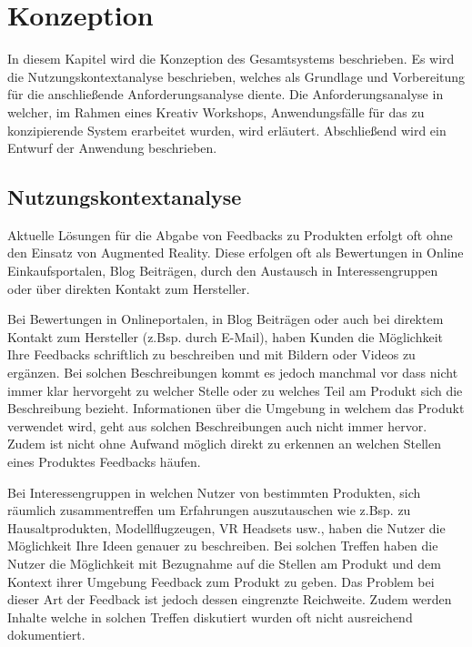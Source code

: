 \chapter{Konzeption}\label{conception_chapter}

In diesem Kapitel wird die Konzeption des Gesamtsystems beschrieben. Es wird die Nutzungskontextanalyse beschrieben, welches als Grundlage und Vorbereitung für die anschließende Anforderungsanalyse diente. Die Anforderungsanalyse in welcher, im Rahmen eines Kreativ Workshops, Anwendungsfälle für das zu konzipierende System erarbeitet wurden, wird erläutert. Abschließend wird ein Entwurf der Anwendung beschrieben.

\section{Nutzungskontextanalyse}

Aktuelle Lösungen für die Abgabe von Feedbacks zu Produkten erfolgt oft ohne den Einsatz von Augmented Reality. Diese erfolgen 
oft als Bewertungen in Online Einkaufsportalen, Blog Beiträgen, durch den Austausch in Interessengruppen oder über direkten Kontakt zum Hersteller.

Bei Bewertungen in Onlineportalen, in Blog Beiträgen oder auch bei direktem Kontakt zum Hersteller (z.Bsp. durch E-Mail), haben Kunden die Möglichkeit 
Ihre Feedbacks schriftlich zu beschreiben und mit Bildern oder Videos zu ergänzen. Bei solchen Beschreibungen kommt es jedoch manchmal vor dass 
nicht immer klar hervorgeht zu welcher Stelle oder zu welches Teil am Produkt sich die Beschreibung bezieht. Informationen über die Umgebung in welchem das Produkt 
verwendet wird, geht aus solchen Beschreibungen auch nicht immer hervor. Zudem ist nicht ohne Aufwand möglich direkt zu erkennen an welchen Stellen eines Produktes 
Feedbacks häufen.

Bei Interessengruppen in welchen Nutzer von bestimmten Produkten, sich räumlich zusammentreffen um Erfahrungen auszutauschen wie z.Bsp. zu Hausaltprodukten, Modellflugzeugen, VR Headsets usw., 
haben die Nutzer die Möglichkeit Ihre Ideen genauer zu beschreiben. 
Bei solchen Treffen haben die Nutzer die Möglichkeit mit Bezugnahme auf die Stellen am Produkt und dem Kontext ihrer Umgebung Feedback zum Produkt zu geben. 
Das Problem bei dieser Art der Feedback ist jedoch dessen eingrenzte Reichweite. Zudem werden Inhalte welche in solchen Treffen diskutiert wurden oft nicht ausreichend dokumentiert.  

